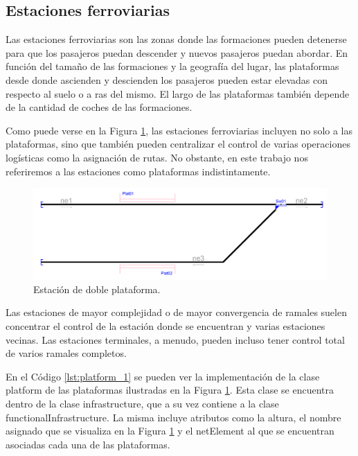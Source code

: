 \subsection{Estaciones ferroviarias}
    \label{sec:platform}
    
    Las estaciones ferroviarias son las zonas donde las formaciones pueden detenerse para que los pasajeros puedan descender y nuevos pasajeros puedan abordar. En función del tamaño de las formaciones y la geografía del lugar, las plataformas desde donde ascienden y descienden los pasajeros pueden estar elevadas con respecto al suelo o a ras del mismo. El largo de las plataformas también depende de la cantidad de coches de las formaciones.
    
    Como puede verse en la Figura \ref{fig:estacion_1}, las estaciones ferroviarias incluyen no solo a las plataformas, sino que también pueden centralizar el control de varias operaciones logísticas como la asignación de rutas. No obstante, en este trabajo nos referiremos a las estaciones como plataformas indistintamente.
    
        \begin{figure}[!h]
            \centering
            \includegraphics[width=1\textwidth]{Figuras/Platform.png}
            \centering\caption{Estación de doble plataforma.}
            \label{fig:estacion_1}
        \end{figure}
    
    Las estaciones de mayor complejidad o de mayor convergencia de ramales suelen concentrar el control de la estación donde se encuentran y varias estaciones vecinas. Las estaciones terminales, a menudo, pueden incluso tener control total de varios ramales completos.

    En el Código \ref{lst:platform_1} se pueden ver la implementación de la clase platform de las plataformas ilustradas en la Figura \ref{fig:estacion_1}. Esta clase se encuentra dentro de la clase infrastructure, que a su vez contiene a la clase functionalInfrastructure. La misma incluye atributos como la altura, el nombre asignado que se visualiza en la Figura \ref{fig:estacion_1} y el netElement al que se encuentran asociadas cada una de las plataformas.

